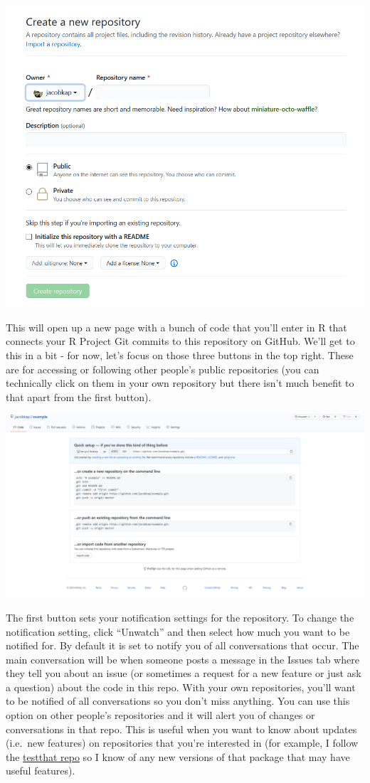 \documentclass[
  12pt,
]{book}
\begin{document}
\includegraphics{images/Github_new_repo2.PNG}

This will open up a new page with a bunch of code that you'll enter in R that connects your R Project Git commits to this repository on GitHub. We'll get to this in a bit - for now, let's focus on those three buttons in the top right. These are for accessing or following other people's public repositories (you can technically click on them in your own repository but there isn't much benefit to that apart from the first button).

\includegraphics{images/Github_new_repo3.PNG}

The first button sets your notification settings for the repository. To change the notification setting, click ``Unwatch'' and then select how much you want to be notified for. By default it is set to notify you of all conversations that occur. The main conversation will be when someone posts a message in the Issues tab where they tell you about an issue (or sometimes a request for a new feature or just ask a question) about the code in this repo. With your own repositories, you'll want to be notified of all conversations so you don't miss anything. You can use this option on other people's repositories and it will alert you of changes or conversations in that repo. This is useful when you want to know about updates (i.e.~new features) on repositories that you're interested in (for example, I follow the \href{https://Github.com/r-lib/testthat}{testthat repo} so I know of any new versions of that package that may have useful features).
\end{document}
